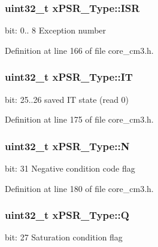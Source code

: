 \hypertarget{unionx_p_s_r___type_a3e9120dcf1a829fc8d2302b4d0673970}{
\subsubsection[{\-I\-S\-R}]{\setlength{\rightskip}{0pt plus 5cm}uint32\-\_\-t {\bf x\-P\-S\-R\-\_\-\-Type\-::\-I\-S\-R}}}\label{unionx_p_s_r___type_a3e9120dcf1a829fc8d2302b4d0673970}
bit\-: 0.. 8 \-Exception number 

\-Definition at line 166 of file core\-\_\-cm3.\-h.

\hypertarget{unionx_p_s_r___type_a3200966922a194d84425e2807a7f1328}{
\subsubsection[{\-I\-T}]{\setlength{\rightskip}{0pt plus 5cm}uint32\-\_\-t {\bf x\-P\-S\-R\-\_\-\-Type\-::\-I\-T}}}\label{unionx_p_s_r___type_a3200966922a194d84425e2807a7f1328}
bit\-: 25..26 saved \-I\-T state (read 0) 

\-Definition at line 175 of file core\-\_\-cm3.\-h.

\hypertarget{unionx_p_s_r___type_a2db9a52f6d42809627d1a7a607c5dbc5}{
\subsubsection[{\-N}]{\setlength{\rightskip}{0pt plus 5cm}uint32\-\_\-t {\bf x\-P\-S\-R\-\_\-\-Type\-::\-N}}}\label{unionx_p_s_r___type_a2db9a52f6d42809627d1a7a607c5dbc5}
bit\-: 31 \-Negative condition code flag 

\-Definition at line 180 of file core\-\_\-cm3.\-h.

\hypertarget{unionx_p_s_r___type_add7cbd2b0abd8954d62cd7831796ac7c}{
\subsubsection[{\-Q}]{\setlength{\rightskip}{0pt plus 5cm}uint32\-\_\-t {\bf x\-P\-S\-R\-\_\-\-Type\-::\-Q}}}\label{unionx_p_s_r___type_add7cbd2b0abd8954d62cd7831796ac7c}
bit\-: 27 \-Saturation condition flag 

